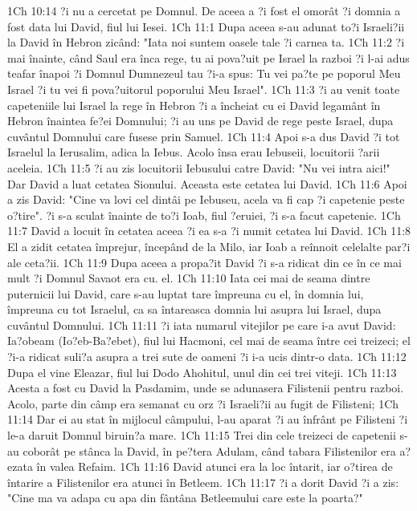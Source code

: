 1Ch 10:14  ?i nu a cercetat pe Domnul. De aceea a ?i fost el omorât ?i domnia a fost data lui David, fiul lui Iesei.
1Ch 11:1  Dupa aceea s-au adunat to?i Israeli?ii la David în Hebron zicând: "Iata noi suntem oasele tale ?i carnea ta.
1Ch 11:2  ?i mai înainte, când Saul era înca rege, tu ai pova?uit pe Israel la razboi ?i l-ai adus teafar înapoi ?i Domnul Dumnezeul tau ?i-a spus: Tu vei pa?te pe poporul Meu Israel ?i tu vei fi pova?uitorul poporului Meu Israel".
1Ch 11:3  ?i au venit toate capeteniile lui Israel la rege în Hebron ?i a încheiat cu ei David legamânt în Hebron înaintea fe?ei Domnului; ?i au uns pe David de rege peste Israel, dupa cuvântul Domnului care fusese prin Samuel.
1Ch 11:4  Apoi s-a dus David ?i tot Israelul la Ierusalim, adica la Iebus. Acolo însa erau Iebuseii, locuitorii ?arii aceleia.
1Ch 11:5  ?i au zis locuitorii Iebusului catre David: "Nu vei intra aici!" Dar David a luat cetatea Sionului. Aceasta este cetatea lui David.
1Ch 11:6  Apoi a zis David: "Cine va lovi cel dintâi pe Iebuseu, acela va fi cap ?i capetenie peste o?tire". ?i s-a sculat înainte de to?i Ioab, fiul ?eruiei, ?i s-a facut capetenie.
1Ch 11:7  David a locuit în cetatea aceea ?i ea s-a ?i numit cetatea lui David.
1Ch 11:8  El a zidit cetatea împrejur, începând de la Milo, iar Ioab a reînnoit celelalte par?i ale ceta?ii.
1Ch 11:9  Dupa aceea a propa?it David ?i s-a ridicat din ce în ce mai mult ?i Domnul Savaot era cu. el.
1Ch 11:10  Iata cei mai de seama dintre puternicii lui David, care s-au luptat tare împreuna cu el, în domnia lui, împreuna cu tot Israelul, ca sa întareasca domnia lui asupra lui Israel, dupa cuvântul Domnului.
1Ch 11:11  ?i iata numarul vitejilor pe care i-a avut David: Ia?obeam (Io?eb-Ba?ebet), fiul lui Hacmoni, cel mai de seama între cei treizeci; el ?i-a ridicat suli?a asupra a trei sute de oameni ?i i-a ucis dintr-o data.
1Ch 11:12  Dupa el vine Eleazar, fiul lui Dodo Ahohitul, unul din cei trei viteji.
1Ch 11:13  Acesta a fost cu David la Pasdamim, unde se adunasera Filistenii pentru razboi. Acolo, parte din câmp era semanat cu orz ?i Israeli?ii au fugit de Filisteni;
1Ch 11:14  Dar ei au stat în mijlocul câmpului, l-au aparat ?i au înfrânt pe Filisteni ?i le-a daruit Domnul biruin?a mare.
1Ch 11:15  Trei din cele treizeci de capetenii s-au coborât pe stânca la David, în pe?tera Adulam, când tabara Filistenilor era a?ezata în valea Refaim.
1Ch 11:16  David atunci era la loc întarit, iar o?tirea de întarire a Filistenilor era atunci în Betleem.
1Ch 11:17  ?i a dorit David ?i a zis: "Cine ma va adapa cu apa din fântâna Betleemului care este la poarta?"
